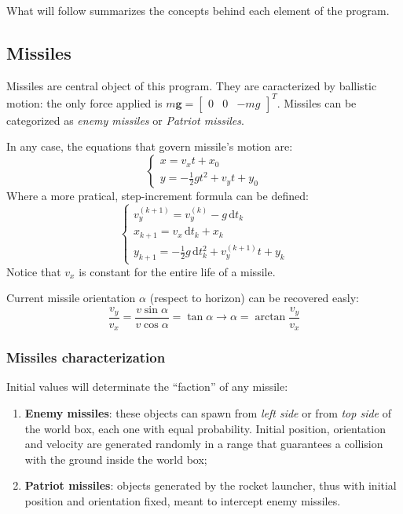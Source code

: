 \documentclass[notitlepage,a4paper,11pt]{article} %
\newcommand{\ud}{\,\mathrm{d}} %
\begin{document}
	What will follow summarizes the concepts behind each element of the program.

	\subsection{Missiles}
		Missiles are central object of this program. They are caracterized by ballistic motion:
		the only force applied is $m\bm{g} = \begin{bmatrix} 0 & 0 & -mg \end{bmatrix} ^T$.
		Missiles can be categorized as \emph{enemy missiles} or \emph{Patriot missiles}.

		In any case, the equations that govern missile's motion are:
		\begin{equation}
			\begin{cases}
				x = v_x t + x_0 \\
				y = - \frac{1}{2} g t^2 + v_y t + y_0
			\end{cases}
		\end{equation}
		Where a more pratical, step-increment formula can be defined:
		\begin{equation}
			\begin{cases}
				v_y^{(k+1)} = v_y^{(k)} - g \ud t_k \\
				x_{k+1} = v_x \ud t_k + x_k \\
				y_{k+1} = - \frac{1}{2} g \ud t_k^2 + v_y^{(k+1)} t + y_k
			\end{cases}
		\end{equation}
		Notice that $v_x$ is constant for the entire life of a missile.

		Current missile orientation $\alpha$ (respect to horizon) can be recovered easly:
		\begin{equation}
			\frac{v_y}{v_x} = \frac{v \sin{\alpha}}{v \cos{\alpha}} = \tan{\alpha}
			\to \alpha = \arctan{\frac{v_y}{v_x}}
		\end{equation}

		\subsubsection{Missiles characterization}

			Initial values will determinate the ``faction'' of any missile:

			\begin{enumerate}

				\item \textbf{Enemy missiles}: these objects can spawn from \emph{left side} or from \emph{top side} of the world box, each one with equal probability. Initial position, orientation and velocity are generated randomly in a range that guarantees a collision with the ground inside the world box;
				\item \textbf{Patriot missiles}: objects generated by the rocket launcher, thus with initial position and orientation fixed, meant to intercept enemy missiles.
			\end{enumerate}
\end{document}
